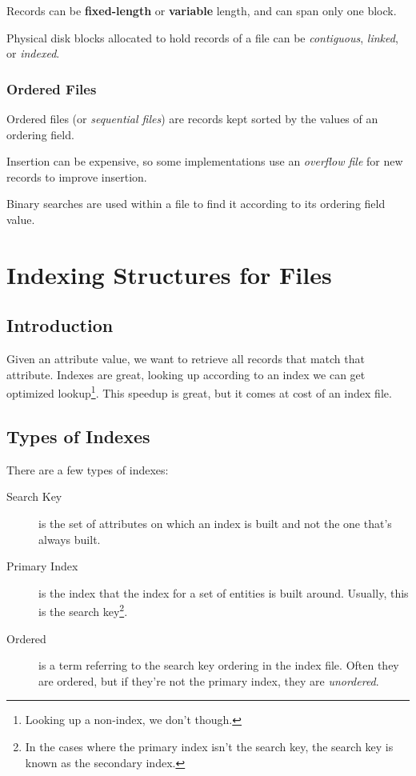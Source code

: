                     Records can be \textbf{fixed-length} or \textbf{variable} length, and can span only one block.

                    Physical disk blocks allocated to hold records of a file can be \textit{contiguous}, \textit{linked}, or \textit{indexed}.
                \subsection{Ordered Files} %
                \label{sub:ordered_files}
                    Ordered files (or \textit{sequential files}) are records kept sorted by the values of an ordering field.

                    Insertion can be expensive, so some implementations use an \textit{overflow file} for new records to improve insertion.

                    Binary searches are used within a file to find it according to its ordering field value.
        \chapter{Indexing Structures for Files} %
        \label{cha:indexing_structures_for_files}
            \section{Introduction} %
            \label{sec:introduction}
                Given an attribute value, we want to retrieve all records that match that attribute.
                Indexes are great, looking up according to an index we can get optimized lookup\footnote{Looking up a non-index, we don't though.}.
                This speedup is great, but it comes at cost of an index file.
            \section{Types of Indexes} %
            \label{sec:types_of_indices}
                There are a few types of indexes:
                \begin{description}
                    \item[Search Key] is the set of attributes on which an index is built and not the one that's always built.
                    \item[Primary Index] is the index that the index for a set of entities is built around.
                    Usually, this is the search key\footnote{In the cases where the primary index isn't the search key, the search key is known as the secondary index.}.
                    \item[Ordered] is a term referring to the search key ordering in the index file.
                    Often they are ordered, but if they're not the primary index, they are \textit{unordered}.
                \end{description}
